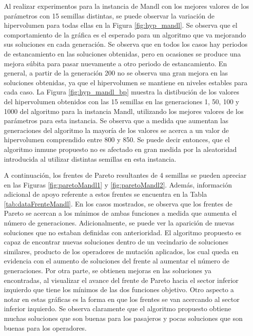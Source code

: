 Al realizar experimentos para la instancia de Mandl con los mejores valores de los parámetros con 15 semillas distintas, se puede observar la variación de hipervolumen para todas ellas en la Figura \ref{fig:hyp_mandl}. Se observa que el comportamiento de la gráfica es el esperado para un algoritmo que va mejorando sus soluciones en cada generación. Se observa que en todos los casos hay periodos de estancamiento en las soluciones obtenidas, pero en ocasiones se produce una mejora súbita para pasar nuevamente a otro periodo de estancamiento. En general, a partir de la generación 200 no se observa una gran mejora en las soluciones obtenidas, ya que el hipervolumen se mantiene en niveles estables para cada caso. La Figura \ref{fig:hyp_mandl_bp} muestra la distibución de los valores del hipervolumen obtenidos con las 15 semillas en las generaciones 1, 50, 100 y 1000 del algoritmo para la instancia Mandl, utilizando los mejores valores de los parámetros para esta instancia. Se observa que a medida que aumentan las generaciones del algoritmo la mayoría de los valores se acerca a un valor de hipervolumen comprendido entre 800 y 850. Se puede decir entonces, que el algoritmo inmune propuesto no es afectado en gran medida por la aleatoridad introducida al utilizar distintas semillas en esta instancia.

A continuación, los frentes de Pareto resultantes de 4 semillas se pueden apreciar en las Figuras \ref{fig:paretoMandl1} y \ref{fig:paretoMandl2}. Además, información adicional de apoyo referente a estos frentes se encuentra en la Tabla \ref{tab:dataFrenteMandl}. En los casos mostrados, se observa que los frentes de Pareto se acercan a los mínimos de ambas funciones a medida que aumenta el número de generaciones. Adicionalmente, se puede ver la aparición de nuevas soluciones que no estaban definidas con anterioridad. El algoritmo propuesto es capaz de encontrar nuevas soluciones dentro de un vecindario de soluciones similares, producto de los operadores de mutación aplicados, los cual queda en evidencia con el aumento de soluciones del frente al aumentar el número de generaciones. Por otra parte, se obtienen mejoras en las soluciones ya encontradas, al visualizar el avance del frente de Pareto hacia el sector inferior izquierdo que tiene los mínimos de las dos funciones objetivo. Otro aspecto a notar en estas gráficas es la forma en que los frentes se van acercando al sector inferior izquierdo. Se observa claramente que el algoritmo propuesto obtiene muchas soluciones que son buenas para los pasajeros y pocas soluciones que son buenas para los operadores. 

